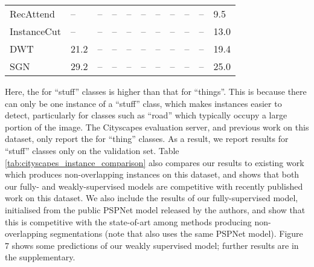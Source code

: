 \documentclass[runningheads]{llncs}
\begin{document}
\begin{table}[t]
{\begin{tabularx}{1.07\linewidth}{lYYYYYYYYYY}
		RecAttend \cite{ren_cvpr_2017} & --  &   --       &   --     &   --        &    --      &   --     & --     &    --     &    --     &   9.5       \\
		InstanceCut \cite{kirillov_cvpr_2017} & --   &   --       &   --     &   --        &    --      &   --     &   --     &    --     &    --     &    13.0      \\
		DWT \cite{bai_cvpr_2017} & 21.2   &   --       &   --     &   --        &    --      &   --     &  --     &    --     &    --     &    19.4       \\
SGN \cite{liu_iccv_2017} &  29.2  &   --       &   --     &   --        &    --      &   --     &    --     &    --     &    --     &    25.0      \\
		\bottomrule
	\end{tabularx}
}
\end{table}
 Here, the  for ``stuff'' classes is higher than that for ``things''.
This is because there can only be one instance of a ``stuff'' class, which makes instances easier to detect, particularly for classes such as ``road'' which typically occupy a large portion of the image.
The Cityscapes evaluation server, and previous work on this dataset, only report the  for ``thing'' classes.
As a result, we report results for ``stuff'' classes only on the validation set.
Table \ref{tab:cityscapes_instance_comparison} also compares our results to existing work which produces non-overlapping instances on this dataset, and shows that both our fully- and weakly-supervised models are competitive with recently published work on this dataset.
We also include the results of our fully-supervised model, initialised from the public PSPNet model \cite{zhao_cvpr_2017} released by the authors, and show that this is competitive with the state-of-art \cite{liu_iccv_2017} among methods producing non-overlapping segmentations (note that \cite{liu_iccv_2017} also uses the same PSPNet model).
Figure 7 shows some predictions of our weakly supervised model; further results are in the supplementary.
\end{document}
